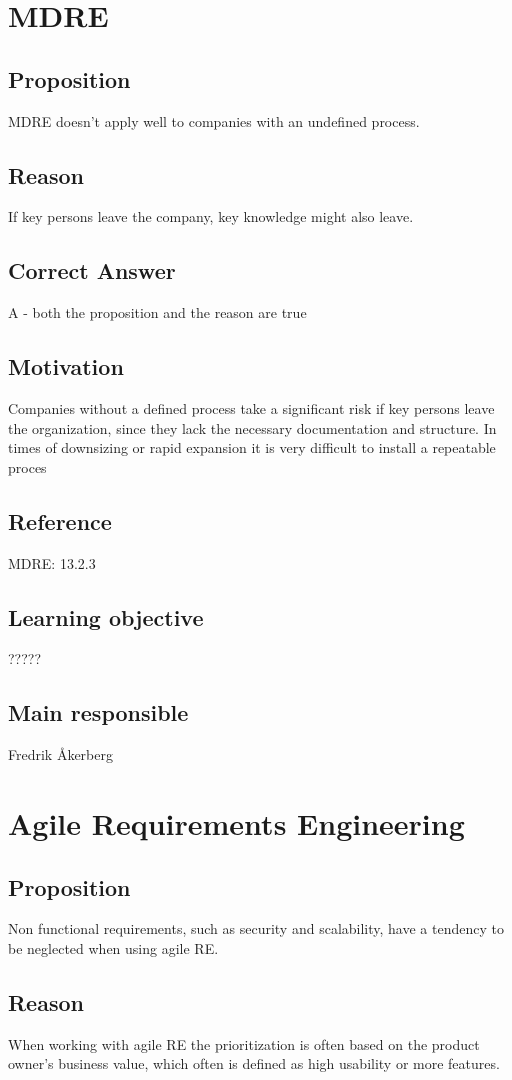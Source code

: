 \documentclass[a4paper]{article}
\begin{document}
\section{MDRE}
\subsection*{Proposition}
MDRE doesn't apply well to companies with an undefined process.
\subsection*{Reason}
If key persons leave the company, key knowledge might also leave.
\subsection*{Correct Answer}
A - both the proposition and the reason are true
\subsection*{Motivation}
Companies without a defined process take a significant risk if key persons leave the organization, since they lack the necessary documentation and structure. In times of downsizing or rapid expansion it is very difficult to install a repeatable proces
\subsection*{Reference}
MDRE: 13.2.3
\subsection*{Learning objective}
?????
\subsection*{Main responsible}
 Fredrik Åkerberg
 
 

\section{Agile Requirements Engineering}
\subsection*{Proposition}
Non functional requirements, such as security and scalability, have a tendency to be neglected when using agile RE. 
\subsection*{Reason}
When working with agile RE the prioritization is often based on the product owner's business value, which often is defined as high usability or more features.
\end{document}

